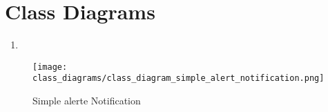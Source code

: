\chapter{Class Diagrams}\label{ch:class_diagrams}

\begin{enumerate}
    \item~
\end{enumerate}

\begin{figure}[]
	\centering
    \caption{Simple alerte Notification}\label{fig:cls_simple_alert_notification}
    \texttt{[image: class\_diagrams/class\_diagram\_simple\_alert\_notification.png]}
\end{figure}
